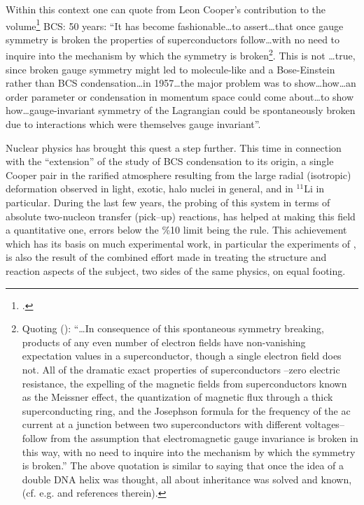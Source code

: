  Within this context one can quote from Leon Cooper's contribution to the volume\footnote{\cite{Cooper:11}.} BCS: 50 years: ``It has become fashionable\dots to assert\dots that once gauge symmetry is broken the properties of superconductors follow\dots with no need to inquire into the mechanism by which the symmetry is broken\footnote{Quoting (\cite{Weinberg:11}): ``\dots In consequence of this spontaneous symmetry breaking, products of any even number of electron fields have non-vanishing expectation values in a superconductor, though a single electron field does not. All of the dramatic exact properties of superconductors --zero electric resistance, the expelling of the magnetic fields from superconductors known as the Meissner effect, the quantization of magnetic flux through a thick superconducting ring, and the Josephson formula for the frequency of the ac current at a junction between two superconductors with different voltages-- follow from the assumption that electromagnetic gauge invariance is broken in this way, with no need to inquire into the mechanism by which the symmetry is broken.'' The above quotation is similar to saying that once the idea of a double DNA helix was thought, all about inheritance was solved and known, (cf. e.g. \cite{Stent:80} and references therein).}. This is not \dots true, since broken gauge symmetry might led to molecule-like and a Bose-Einstein rather than BCS condensation\dots in 1957\dots the major problem was to show\dots how\dots an order parameter or condensation in momentum space could come about\dots to show how\dots gauge-invariant symmetry of the Lagrangian could be spontaneously broken due to interactions which were themselves gauge invariant''.


Nuclear physics has brought this quest a step further. This time in connection with the ``extension'' of the study of BCS condensation to its origin, a single Cooper pair in the rarified atmosphere resulting from the large radial (isotropic) deformation observed in light, exotic, halo nuclei in general, and in $^{11}$Li in particular. During the last few years, the probing of this system in terms of absolute two-nucleon transfer (pick--up) reactions, has helped at making this field a quantitative one, errors below the \%10 limit being the rule. This achievement which has its basis on much experimental work, in particular the  experiments of \cite{Tanihata:08}, is also the result of the combined effort made in treating the structure and reaction aspects of the subject, two sides of the same physics, on equal footing. 

